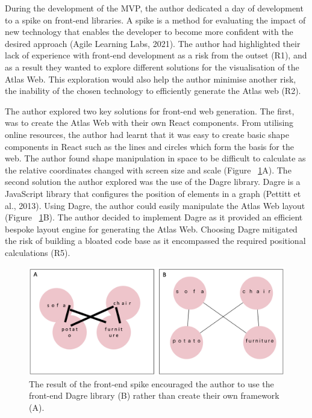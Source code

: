 \documentclass{article}
\begin{document}
During the development of the MVP, the author dedicated a day of development to a spike on front-end libraries. A spike is a method for evaluating the impact of new technology that enables the developer to become more confident with the desired approach (Agile Learning Labs, 2021). The author had highlighted their lack of experience with front-end development as a risk from the outset (R1), and as a result they wanted to explore different solutions for the visualisation of the Atlas Web. This exploration would also help the author minimise another  risk, the inability of the chosen technology to efficiently generate the Atlas web (R2).

The author explored two key solutions for front-end web generation. The first, was to create the Atlas Web with their own React components. From utilising online resources, the author had learnt that it was easy to create basic shape components in React such as the lines and circles which form the basis for the web. The author found shape manipulation in space to be difficult to calculate as the relative coordinates changed with screen size and scale (Figure ~\ref{fig:dagre}A). The second solution the author explored was the use of the Dagre library. Dagre is a JavaScript library that configures the position of elements in a graph (Pettitt et al., 2013). Using Dagre, the author could easily manipulate the Atlas Web layout (Figure ~\ref{fig:dagre}B). The author decided to implement Dagre as it provided an efficient bespoke layout engine for generating the Atlas Web. Choosing Dagre mitigated the risk of building a bloated code base as it encompassed the required positional calculations (R5).

\begin{figure}[!b]
  \centering
      \includegraphics[width=1\textwidth]{images/dagre.png}
  \caption{The result of the front-end spike encouraged the author to use the front-end Dagre library (B) rather than create their own framework (A).}
  \label{fig:dagre}
\end{figure}
\end{document}
